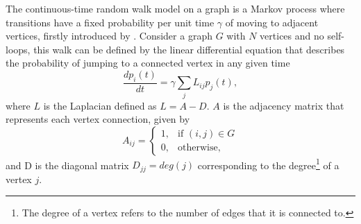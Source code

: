 \documentclass[../../dissertation.tex]{subfiles}
\begin{document}
The continuous-time random walk model on a graph is a Markov process where transitions have a fixed probability per unit time $\gamma$ of moving to adjacent vertices, firstly introduced by \cite{montrollweiss1965}. Consider a graph $G$ with $N$ vertices and no self-loops, this walk can be defined by the linear differential equation that describes the probability of jumping to a connected vertex in any given time 
\begin{equation}
	\frac{dp_i(t)}{dt} = \gamma \sum_j L_{ij} p_j(t), \label{contWalk}
\end{equation}
where $L$ is the Laplacian defined as $L = A - D$. $A$ is the adjacency matrix that represents each vertex connection, given by
\begin{equation}
	A_{ij} = \begin{cases} 1, & \mbox{if } (i,j)\in G \\ 0, & \mbox{otherwise,} \end{cases}
\end{equation}
and D is the diagonal matrix $D_{jj} = deg(j)$ corresponding to the degree\footnote{The degree of a vertex refers to the number of edges that it is connected to.} of a vertex $j$.
\end{document}
